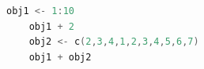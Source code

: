 \begin{lstlisting}[language=c++,label={code:05_05},caption={Vector processing}]
	obj1 <- 1:10
	obj1 + 2
	obj2 <- c(2,3,4,1,2,3,4,5,6,7)
	obj1 + obj2
\end{lstlisting}
